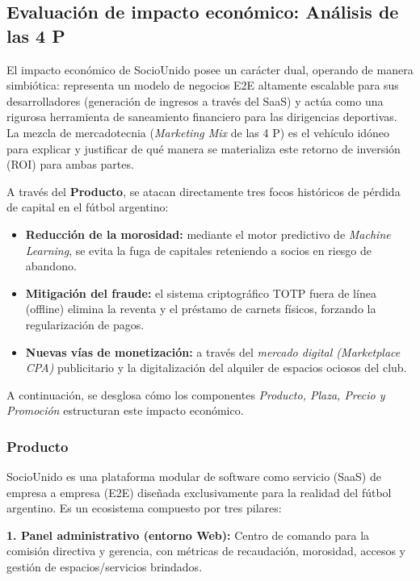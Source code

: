 \newpage

\subsection{Evaluación de impacto económico: Análisis de las 4 P}

El impacto económico de SocioUnido posee un carácter dual, operando de manera simbiótica: representa un modelo de negocios E2E altamente escalable para sus desarrolladores (generación de ingresos a través del SaaS) y actúa como una rigurosa herramienta de saneamiento financiero para las dirigencias deportivas. La mezcla de mercadotecnia (\textit{Marketing Mix} de las 4 P) es el vehículo idóneo para explicar y justificar de qué manera se materializa este retorno de inversión (ROI) para ambas partes.

A través del \textbf{Producto}, se atacan directamente tres focos históricos de pérdida de capital en el fútbol argentino:
\begin{itemize}
    \item \textbf{Reducción de la morosidad:} mediante el motor predictivo de \textit{Machine Learning}, se evita la fuga de capitales reteniendo a socios en riesgo de abandono.
    \item \textbf{Mitigación del fraude:} el sistema criptográfico TOTP fuera de línea (offline) elimina la reventa y el préstamo de carnets físicos, forzando la regularización de pagos.
    \item \textbf{Nuevas vías de monetización:} a través del \textit{mercado digital (Marketplace CPA)} publicitario y la digitalización del alquiler de espacios ociosos del club.
\end{itemize}

A continuación, se desglosa cómo los componentes \textit{Producto, Plaza, Precio y Promoción} estructuran este impacto económico.

\subsubsection*{Producto}

SocioUnido es una plataforma modular de software como servicio (SaaS) de empresa a empresa (E2E) diseñada exclusivamente para la realidad del fútbol argentino. Es un ecosistema compuesto por tres pilares:

\textbf{1. Panel administrativo (entorno Web):} Centro de comando para la comisión directiva y gerencia, con métricas de recaudación, morosidad, accesos y gestión de espacios/servicios brindados.

